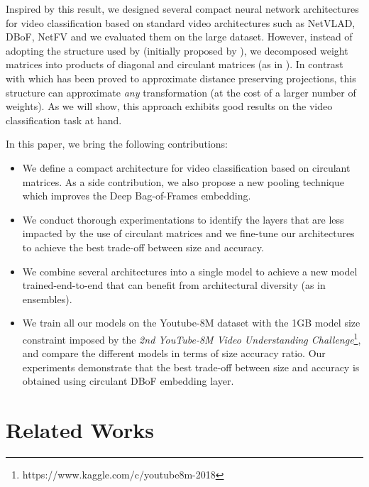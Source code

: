 Inspired by this result, we designed several compact neural network architectures for video classification based on standard video architectures such as NetVLAD, DBoF, NetFV and we evaluated them on the large \yt dataset.
However, instead of adopting the structure used by \cite{cheng} (initially proposed by \cite{VYBIRAL20111096}), we decomposed weight matrices into products of diagonal and circulant matrices (as in \cite{schmid2000decomposing}).
In contrast with \cite{VYBIRAL20111096} which has been proved to approximate distance preserving projections, this structure can approximate \emph{any} transformation (at the cost of a larger number of weights).
As we will show, this approach exhibits good results on the video classification task at hand. 

In this paper, we bring the following contributions:

\begin{itemize}
  \item We define a compact architecture for video classification based on circulant matrices.
  As a side contribution, we also propose a new pooling technique which improves the Deep Bag-of-Frames embedding. 
  \item We conduct thorough experimentations to identify the layers that are less impacted by the use of circulant matrices and we fine-tune our architectures to achieve the best trade-off between size and accuracy.  
  \item We combine several architectures into a single model to achieve a new model trained-end-to-end that can benefit from architectural diversity (as in ensembles).
  \item We train all our models on the Youtube-8M dataset with the 1GB model size constraint imposed by the \emph{2nd YouTube-8M Video Understanding Challenge}\footnote{https://www.kaggle.com/c/youtube8m-2018}, and compare the different models in terms of size \vs accuracy ratio.
  Our experiments demonstrate that the best trade-off between size and accuracy is obtained using circulant DBoF embedding layer.
\end{itemize}

\section{Related Works}
\label{section:ch4-related-work}

